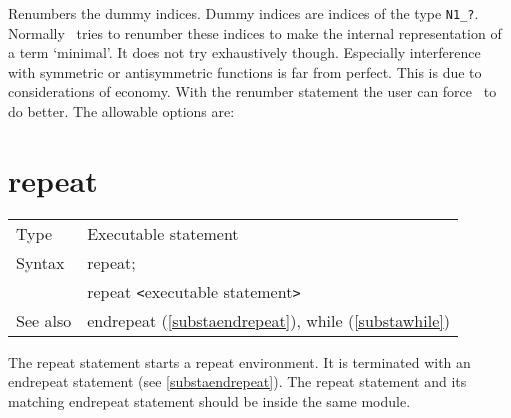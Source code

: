 \noindent Renumbers the dummy 
indices. Dummy indices are indices of the type 
\verb:N1_?:. Normally \FORM\ tries to renumber these indices to make the 
internal representation of a term `minimal'. It does not try exhaustively 
though. Especially interference with symmetric or antisymmetric functions 
is far from perfect. This is due to considerations of economy. With the 
renumber statement the user can force \FORM\ to do better. The allowable 
options are:


\vspace{10mm}


\section{repeat}
\label{substarepeat}

\noindent \begin{tabular}{ll}
Type & Executable statement\\
Syntax & repeat; \\
       & repeat {\tt<}executable statement{\tt>}
\\ See also & endrepeat (\ref{substaendrepeat}), while (\ref{substawhile})
\end{tabular} \vspace{4mm}

\noindent The repeat statement starts a
repeat environment. It is terminated with an 
endrepeat statement (see \ref{substaendrepeat}). The 
repeat statement and its matching endrepeat statement should be inside the 
same module. \vspace{4mm}

